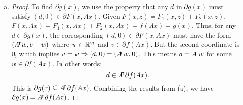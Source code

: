 \documentclass{article}
\begin{document}
\begin{solution}
\begin{enumerate}[(a)]
{\begin{proof}
\begin{itemize}
                \end{itemize}
            \end{proof}
        }
        \item {
            \begin{proof}
                To find $\partial g(x)$, we use the property that any $d$ in $\partial g(x)$ must satisfy $(d,0)\in\partial F(x,Ax)$. Given $F(x,z)=F_1(x,z)+F_2(x,z)$, $F(x,Ax)=F_1(x,Ax)+F_2(x,Ax)=f(Ax)=g(x)$. Thus, for any $d\in\partial g(x)$, the corresponding $(d,0)\in\partial F(x,Ax)$ must have the form $(A{}^{\mkern-4mu\intercal} w, v-w)$ where $w\in\mathbb{R}^m$ and $v\in\partial f(Ax)$. But the second coordinate is $0$, which implies $v=w\Rightarrow (d,0)=(A{}^{\mkern-4mu\intercal} w,0)$. This means $d=A{}^{\mkern-4mu\intercal} w$ for some $w\in\partial f(Ax)$. In other words: \[d\in A{}^{\mkern-4mu\intercal}\partial f(Ax).\] This is $\partial g(x)\subseteq A{}^{\mkern-4mu\intercal}\partial f(Ax)$. Combining the results from (a), we have $\partial g(x)=A{}^{\mkern-4mu\intercal}\partial f(Ax)$.
            \end{proof}
        }
    \end{enumerate}
\end{solution}
\end{document}
